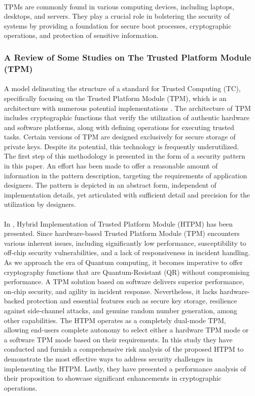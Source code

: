 \paragraph*{}
TPMs are commonly found in various computing devices, including laptops, desktops, and servers. They play a crucial role in bolstering the security of systems by providing a foundation for secure boot processes, cryptographic operations, and protection of sensitive information.
\subsubsection{A Review of Some Studies on The Trusted Platform Module (TPM)}
\paragraph*{}
A model delineating the structure of a standard for Trusted Computing (TC), specifically focusing on the Trusted Platform Module (TPM), which is an architecture with numerous potential implementations \cite{10.1145/3424771.3424781}. The architecture of TPM includes cryptographic functions that verify the utilization of authentic hardware and software platforms, along with defining operations for executing trusted tasks. Certain versions of TPM are designed exclusively for secure storage of private keys. Despite its potential, this technology is frequently underutilized. The first step of this methodology is presented in the form of a security pattern in this paper. An effort has been made to offer a reasonable amount of information in the pattern description, targeting the requirements of application designers. The pattern is depicted in an abstract form, independent of implementation details, yet articulated with sufficient detail and precision for the utilization by designers.
\paragraph*{}
In \cite{10.1145/3338511.3357348}, Hybrid Implementation of Trusted Platform Module (HTPM) has been presented. Since hardware-based Trusted Platform Module (TPM) encounters various inherent issues, including significantly low performance, susceptibility to off-chip security vulnerabilities, and a lack of responsiveness in incident handling. As we approach the era of Quantum computing, it becomes imperative to offer cryptography functions that are Quantum-Resistant (QR) without compromising performance. A TPM solution based on software delivers superior performance, on-chip security, and agility in incident response. Nevertheless, it lacks hardware-backed protection and essential features such as secure key storage, resilience against side-channel attacks, and genuine random number generation, among other capabilities. The HTPM operates as a completely dual-mode TPM, allowing end-users complete autonomy to select either a hardware TPM mode or a software TPM mode based on their requirements. In this study they have conducted and furnish a comprehensive risk analysis of the proposed HTPM to demonstrate the most effective ways to address security challenges in implementing the HTPM. Lastly, they have presented a performance analysis of their proposition to showcase significant enhancements in cryptographic operations.
